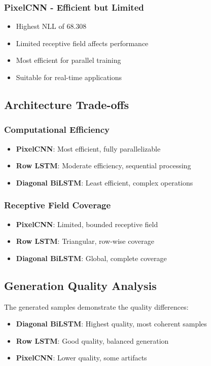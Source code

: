 \documentclass[norunningheads]{llncs}
\begin{document}
\subsubsection{PixelCNN - Efficient but Limited}
\begin{itemize}
\item Highest NLL of 68.308
\item Limited receptive field affects performance
\item Most efficient for parallel training
\item Suitable for real-time applications
\end{itemize}

\subsection{Architecture Trade-offs}

\subsubsection{Computational Efficiency}
\begin{itemize}
\item \textbf{PixelCNN}: Most efficient, fully parallelizable
\item \textbf{Row LSTM}: Moderate efficiency, sequential processing
\item \textbf{Diagonal BiLSTM}: Least efficient, complex operations
\end{itemize}

\subsubsection{Receptive Field Coverage}
\begin{itemize}
\item \textbf{PixelCNN}: Limited, bounded receptive field
\item \textbf{Row LSTM}: Triangular, row-wise coverage
\item \textbf{Diagonal BiLSTM}: Global, complete coverage
\end{itemize}

\subsection{Generation Quality Analysis}

The generated samples demonstrate the quality differences:
\begin{itemize}
\item \textbf{Diagonal BiLSTM}: Highest quality, most coherent samples
\item \textbf{Row LSTM}: Good quality, balanced generation
\item \textbf{PixelCNN}: Lower quality, some artifacts
\end{itemize}
\end{document}
